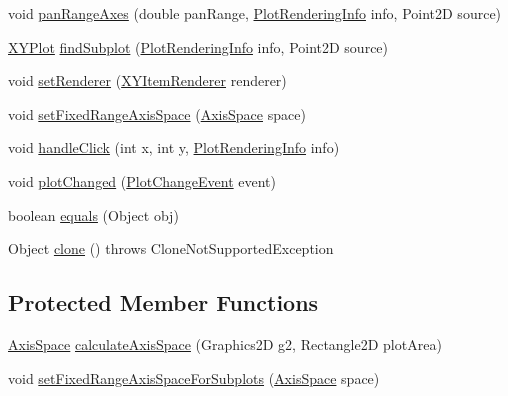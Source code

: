 \begin{DoxyCompactItemize}
\item 
void \mbox{\hyperlink{classorg_1_1jfree_1_1chart_1_1plot_1_1_combined_domain_x_y_plot_aa2f62463d5afbab1a8de6cc6e832b2b0}{pan\+Range\+Axes}} (double pan\+Range, \mbox{\hyperlink{classorg_1_1jfree_1_1chart_1_1plot_1_1_plot_rendering_info}{Plot\+Rendering\+Info}} info, Point2D source)
\item 
\mbox{\hyperlink{classorg_1_1jfree_1_1chart_1_1plot_1_1_x_y_plot}{X\+Y\+Plot}} \mbox{\hyperlink{classorg_1_1jfree_1_1chart_1_1plot_1_1_combined_domain_x_y_plot_a82f1d9d7dd0e921f206dfbe9a672ccee}{find\+Subplot}} (\mbox{\hyperlink{classorg_1_1jfree_1_1chart_1_1plot_1_1_plot_rendering_info}{Plot\+Rendering\+Info}} info, Point2D source)
\item 
void \mbox{\hyperlink{classorg_1_1jfree_1_1chart_1_1plot_1_1_combined_domain_x_y_plot_ae97dc70e30502e51dde75091d449c49b}{set\+Renderer}} (\mbox{\hyperlink{interfaceorg_1_1jfree_1_1chart_1_1renderer_1_1xy_1_1_x_y_item_renderer}{X\+Y\+Item\+Renderer}} renderer)
\item 
void \mbox{\hyperlink{classorg_1_1jfree_1_1chart_1_1plot_1_1_combined_domain_x_y_plot_a1aaffea04f5f4fa114ffda688c17e3b0}{set\+Fixed\+Range\+Axis\+Space}} (\mbox{\hyperlink{classorg_1_1jfree_1_1chart_1_1axis_1_1_axis_space}{Axis\+Space}} space)
\item 
void \mbox{\hyperlink{classorg_1_1jfree_1_1chart_1_1plot_1_1_combined_domain_x_y_plot_adeb3261faa25890223ebf36005bd1df0}{handle\+Click}} (int x, int y, \mbox{\hyperlink{classorg_1_1jfree_1_1chart_1_1plot_1_1_plot_rendering_info}{Plot\+Rendering\+Info}} info)
\item 
void \mbox{\hyperlink{classorg_1_1jfree_1_1chart_1_1plot_1_1_combined_domain_x_y_plot_a7a15ebdea6f0f11d30013d15724f3e86}{plot\+Changed}} (\mbox{\hyperlink{classorg_1_1jfree_1_1chart_1_1event_1_1_plot_change_event}{Plot\+Change\+Event}} event)
\item 
boolean \mbox{\hyperlink{classorg_1_1jfree_1_1chart_1_1plot_1_1_combined_domain_x_y_plot_a3f3b8600d92ab66cc3603aa32c8d7bed}{equals}} (Object obj)
\item 
Object \mbox{\hyperlink{classorg_1_1jfree_1_1chart_1_1plot_1_1_combined_domain_x_y_plot_a05f910d3f47a9b258e723b8a2ff08b8a}{clone}} ()  throws Clone\+Not\+Supported\+Exception 
\end{DoxyCompactItemize}
\subsection*{Protected Member Functions}
\begin{DoxyCompactItemize}
\item 
\mbox{\hyperlink{classorg_1_1jfree_1_1chart_1_1axis_1_1_axis_space}{Axis\+Space}} \mbox{\hyperlink{classorg_1_1jfree_1_1chart_1_1plot_1_1_combined_domain_x_y_plot_a574fc059ba1ddc1ec5e24a656b4e7a41}{calculate\+Axis\+Space}} (Graphics2D g2, Rectangle2D plot\+Area)
\item 
void \mbox{\hyperlink{classorg_1_1jfree_1_1chart_1_1plot_1_1_combined_domain_x_y_plot_aa40edb29e6909b6855681ce174dffd5b}{set\+Fixed\+Range\+Axis\+Space\+For\+Subplots}} (\mbox{\hyperlink{classorg_1_1jfree_1_1chart_1_1axis_1_1_axis_space}{Axis\+Space}} space)
\end{DoxyCompactItemize}
